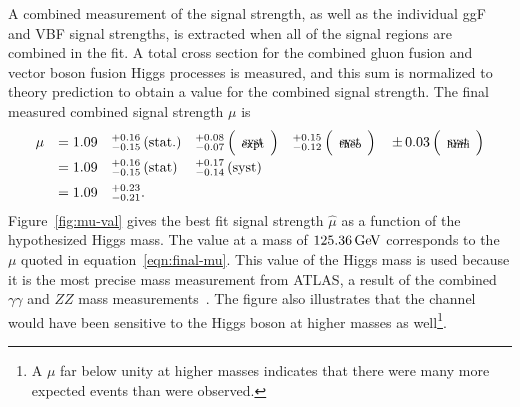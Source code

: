 A combined measurement of the signal strength, as well as the individual ggF and VBF signal strengths, is extracted when all of the signal regions are combined in the fit. A total cross section for the combined gluon fusion and vector boson fusion Higgs processes is measured, and this sum is normalized to theory prediction to obtain a value for the combined signal strength. The final measured combined signal strength $\mu$ is
%
\begin{equation}
\begin{array}{llllll}
 \mu
 &= 1.09%
 &^{+0.16}_{-0.15}\,(\textrm{stat.})%
 &^{+0.08}_{-0.07}\,\Big(\!\begin{tabular}{c}{\rm\footnotesize expt}\\ \noalign{\vskip -0.50truecm}{\rm\footnotesize syst}\end{tabular}\!\Big)%
 &^{+0.15}_{-0.12}\,\Big(\!\begin{tabular}{c}{\rm\footnotesize theo}\\ \noalign{\vskip -0.50truecm}{\rm\footnotesize syst}\end{tabular}\!\Big)%
 &{\PM}0.03\,\Big(\!\begin{tabular}{c}{\rm\footnotesize lumi}\\ \noalign{\vskip -0.50truecm}{\rm\footnotesize syst}\end{tabular}\!\Big)%
 \\
 \clineskip
 &= 1.09 &^{+0.16}_{-0.15}\,\textrm{(stat)} &^{+0.17}_{-0.14}\,\textrm{(syst)}
 \\
 \clineskip
 \clineskip
 &= 1.09 &^{+0.23}_{-0.21}.
\end{array}
\label{eqn:final-mu}
\end{equation}
%
Figure~\ref{fig:mu-val} gives the best fit signal strength $\hat{\mu}$ as a function of the hypothesized Higgs mass. The value at a mass of $125.36 \GeV$ corresponds to the $\mu$ quoted in equation~\ref{eqn:final-mu}. This value of the Higgs mass is used because it is the most precise mass measurement from ATLAS, a result of the combined $\gamma\gamma$ and $ZZ$ mass measurements~\cite{HiggsMass}. The figure also illustrates that the \HWWfull channel would have been sensitive to the Higgs boson at higher masses as well\footnote{A $\mu$ far below unity at higher masses indicates that there were many more expected events than were observed.}. 

